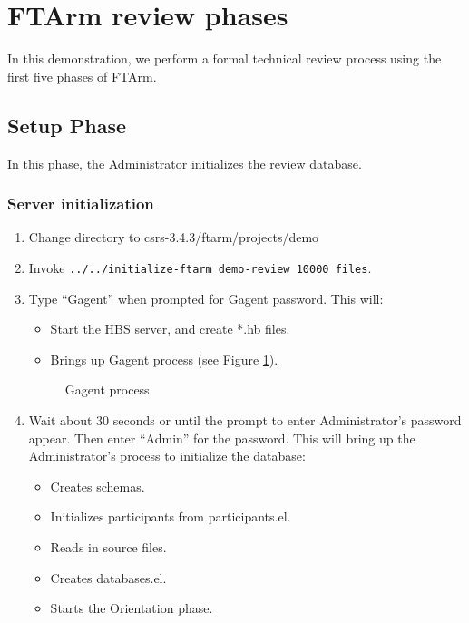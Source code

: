 \newpage
\section {FTArm review phases}
In this demonstration, we perform a formal technical review process
using the first five phases of FTArm.

\subsection{Setup Phase}
In this phase, the Administrator initializes the review database.

\subsubsection{Server initialization}

\begin{enumerate}
\item Change directory to csrs-3.4.3/ftarm/projects/demo
\item Invoke {\tt ../../initialize-ftarm demo-review 10000 files}.
\item Type ``Gagent'' when prompted for Gagent password. This will: 
  \begin{itemize}
  \item Start the HBS server, and create *.hb files.
  \item Brings up Gagent process (see Figure \ref{Gagent}). 
  \end{itemize}
\begin{figure}[htb]
  {\centerline{}}
  \caption{Gagent process}
  \label{Gagent}
\end{figure}

\item Wait about 30 seconds or until the prompt to enter
Administrator's password appear. 
 Then enter ``Admin'' for the password. This will
 bring up the Administrator's process to initialize the database:
  \begin{itemize}
  \item Creates schemas.
  \item Initializes participants from participants.el.
  \item Reads in source files.
  \item Creates databases.el.
  \item Starts the Orientation phase.
  \end{itemize}
\end{enumerate}


